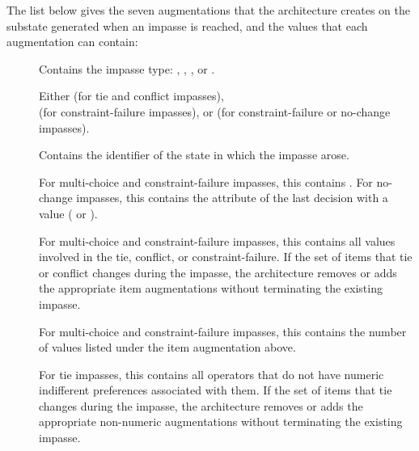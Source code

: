 The list below gives the seven augmentations that the architecture creates on the substate generated when an impasse is reached, and the values that each augmentation can contain:

\begin{description}
\item []
	\vspace{-8pt}
\item []
	Contains the impasse type:
	, , , or .
	\vspace{-8pt}
\item []
	Either  (for tie and conflict impasses),
	 \\ (for constraint-failure impasses), or
	 (for constraint-failure or no-change impasses).
	\vspace{-8pt}
\item []
	Contains the identifier of the state in which the impasse arose.
	\vspace{-8pt}
\item []
	For multi-choice and constraint-failure impasses, this contains . For no-change impasses, this contains the attribute of the last decision with a value ( or ).
	\vspace{-8pt}
\item []
	For multi-choice and constraint-failure impasses, this contains all values involved in the tie, conflict, or constraint-failure. If the set of items that tie or conflict changes during the impasse, the architecture removes or adds the appropriate item augmentations without terminating the existing impasse.
	\vspace{-8pt}
\item []
	For multi-choice and constraint-failure impasses, this contains the number of values listed under the item augmentation above.
	\vspace{-8pt}
\item []
	For tie impasses, this contains all operators that do not have numeric indifferent preferences associated with them. If the set of items that tie changes during the impasse, the architecture removes or adds the appropriate non-numeric augmentations without terminating the existing impasse.

\end{description}
